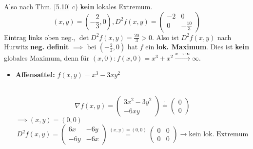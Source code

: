 \begin{example}
	Also nach Thm. \ref{5.10} c) \textbf{kein} lokales Extremum.
	\[
		(x, y) = \left( - \frac{ 2 }{ 3 } , 0 \right) , D^2 f\left( x, y \right) = \begin{pmatrix} -2 & 0 \\ 0 & - \frac{ 10 }{ 3 }  \end{pmatrix} 
	\]
	Eintrag links oben neg., $ \det D^2f(x, y) = \frac{ 20 }{ 3 } > 0 $. Also ist $ D^2 f(x, y) $ nach Hurwitz \textbf{neg. definit} $ \implies  $ bei $ \left( -\frac{ 2 }{ 3 } , 0 \right)  $ hat $ f $ ein \textbf{lok. Maximum}.
	Dies ist \textbf{kein} globales Maximum, denn für $ (x, 0): f(x, 0) = x^3 + x^2 \overset{x \to \infty}{\longrightarrow} \infty $.

	\begin{itemize}
		\item \textbf{Affensattel:} $ f(x, y) = x^3 - 3xy^2 $ 
			\\
			\[
				\nabla f(x, y) = \begin{pmatrix} 3x^2 - 3y^2 \\ -6xy \end{pmatrix} \overset{!}{=} \begin{pmatrix} 0 \\ 0 \end{pmatrix} 
			\]
			$ \implies (x, y) = (0, 0) $ 
			\[
				D^2 f(x, y) = \begin{pmatrix} 6x & -6y \\ -6y & -6x \end{pmatrix} \overset{(x, y) = (0, 0)}{=} \begin{pmatrix} 0 & 0 \\ 0 & 0 \end{pmatrix} \to \text{kein lok. Extremum} 
			\]
	\end{itemize}
	
\end{example}

